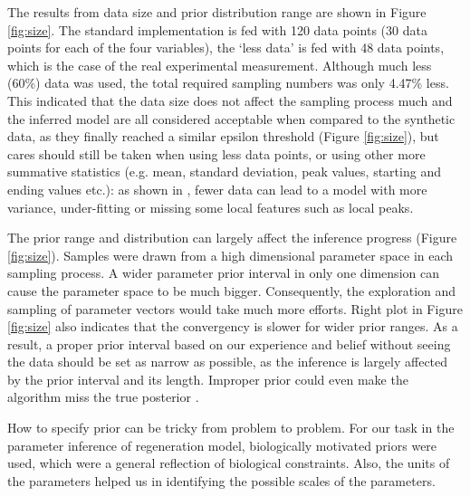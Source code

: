 The results from data size and prior distribution range are shown in Figure \ref{fig:size}. The standard implementation is fed with 120 data points (30 data points for each of the four variables), the `less data' is fed with 48 data points, which is the case of the real experimental measurement. Although much less (60\%) data was used, the total required sampling numbers was only 4.47\% less. This indicated that the data size does not affect the sampling process much and the inferred model are all considered acceptable when compared to the synthetic data, as they finally reached a similar epsilon threshold (Figure \ref{fig:size}), but cares should still be taken when using less data points, or using other more summative statistics (e.g. mean, standard deviation, peak values, starting and ending values etc.): as shown in \cite{ref:disease}, fewer data can lead to a model with more variance, under-fitting or missing some local features such as local peaks.

The prior range and distribution can largely affect the inference progress (Figure \ref{fig:size}). Samples were drawn from a high dimensional parameter space in each sampling process. A wider parameter prior interval in only one dimension can cause the parameter space to be much bigger. Consequently, the exploration and sampling of parameter vectors would take much more efforts. Right plot in Figure \ref{fig:size} also indicates that the convergency is slower for wider prior ranges. As a result, a proper prior interval based on our experience and belief without seeing the data should be set as narrow as possible, as the inference is largely affected by the prior interval and its length. Improper prior could even make the algorithm miss the true posterior \cite{ref:abcsysbio}.

How to specify prior can be tricky from problem to problem. For our task in the parameter inference of regeneration model, biologically motivated priors were used, which were a general reflection of biological constraints. Also, the units of the parameters helped us in identifying the possible scales of the parameters.




